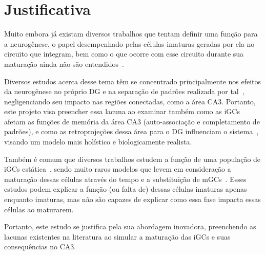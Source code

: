 \chapter{Justificativa}

Muito embora já existam diversos trabalhos que tentam definir uma função para a neurogênese, o papel desempenhado pelas células
imaturas geradas por ela no circuito que integram, bem como o que ocorre com esse circuito durante sua maturação ainda não são
entendidos~\cite{aimoneComputational2016, aimoneModeling2011, berdugo-vegaSharpening2023, faresNeurogenesis2019}.

Diversos estudos acerca desse tema têm se concentrado principalmente nos efeitos da neurogênese no próprio DG e na separação de
padrões realizada por tal~\cite{berdugo-vegaSharpening2023, kimAdult2024,wangEffect2024}, negligenciando seu impacto nas regiões
conectadas, como a área CA3. Portanto, este projeto visa preencher essa lacuna ao examinar também como as iGCs afetam as funções
de memória da área CA3 (auto-associação e completamento de padrões), e como as retroprojeções dessa área para o DG influenciam o
sistema~\cite{myersPattern2011}, visando um modelo mais holístico e biologicamente realista.

Também é comum que diversos trabalhos estudem a função de uma população de iGCs estática~\cite{aimoneComputational2016,
berdugo-vegaSharpening2023}, sendo muito raros modelos que levem em consideração a maturação dessas células através do tempo e a
substituição de mGCs~\cite{aimoneComputational2009}. Esses estudos podem explicar a função (ou falta de) dessas células imaturas
apenas enquanto imaturas, mas não são capazes de explicar como essa fase impacta essas células ao maturarem.

Portanto, este estudo se justifica pela sua abordagem inovadora, preenchendo as lacunas existentes na literatura ao
simular a maturação das iGCs e suas consequências no CA3.


